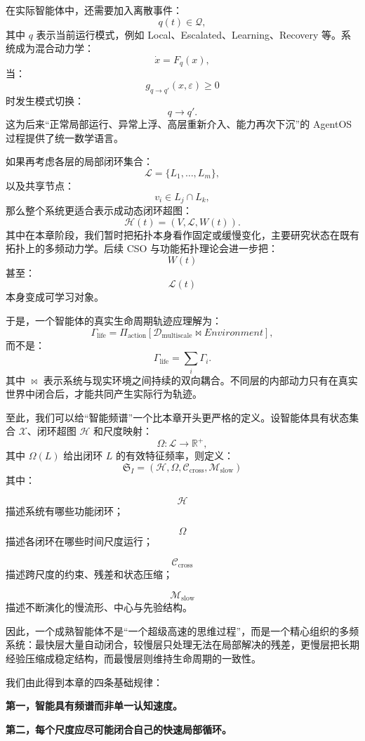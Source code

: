 在实际智能体中，还需要加入离散事件：
\[
q(t)\in\mathcal{Q},
\]
其中 $q$ 表示当前运行模式，例如 Local、Escalated、Learning、Recovery 等。系统成为混合动力学：
\[
\dot{x}
=
F_q(x),
\]
当：
\[
g_{q\rightarrow q'}(x,\varepsilon)
\geq0
\]
时发生模式切换：
\[
q\rightarrow q'.
\]
这为后来“正常局部运行、异常上浮、高层重新介入、能力再次下沉”的 AgentOS 过程提供了统一数学语言。

如果再考虑各层的局部闭环集合：
\[
\mathcal{L}
=
\{L_1,\ldots,L_m\},
\]
以及共享节点：
\[
v_i
\in
L_j\cap L_k,
\]
那么整个系统更适合表示成动态闭环超图：
\[
\mathcal{H}(t)
=
\left(
V,
\mathcal{L},
W(t)
\right).
\]
其中在本章阶段，我们暂时把拓扑本身看作固定或缓慢变化，主要研究状态在既有拓扑上的多频动力学。后续 CSO 与功能拓扑理论会进一步把：
\[
W(t)
\]
甚至：
\[
\mathcal{L}(t)
\]
本身变成可学习对象。

于是，一个智能体的真实生命周期轨迹应理解为：
\[
\Gamma_{\mathrm{life}}
=
\Pi_{\mathrm{action}}
\left[
\mathcal{D}_{\mathrm{multiscale}}
\bowtie
Environment
\right],
\]
而不是：
\[
\Gamma_{\mathrm{life}}
=
\sum_i
\Gamma_i.
\]
其中 $\bowtie$ 表示系统与现实环境之间持续的双向耦合。不同层的内部动力只有在真实世界中闭合后，才能共同产生实际行为轨迹。

至此，我们可以给“智能频谱”一个比本章开头更严格的定义。设智能体具有状态集合 $\mathcal{X}$、闭环超图 $\mathcal{H}$ 和尺度映射：
\[
\Omega:
\mathcal{L}
\rightarrow
\mathbb{R}^{+},
\]
其中 $\Omega(L)$ 给出闭环 $L$ 的有效特征频率，则定义：
\[
\boxed{
\mathfrak{S}_I
=
\left(
\mathcal{H},
\Omega,
\mathcal{C}_{\mathrm{cross}},
\mathcal{M}_{\mathrm{slow}}
\right)
}
\]
其中：

\[
\mathcal{H}
\]
描述系统有哪些功能闭环；

\[
\Omega
\]
描述各闭环在哪些时间尺度运行；

\[
\mathcal{C}_{\mathrm{cross}}
\]
描述跨尺度的约束、残差和状态压缩；

\[
\mathcal{M}_{\mathrm{slow}}
\]
描述不断演化的慢流形、中心与先验结构。

因此，一个成熟智能体不是“一个超级高速的思维过程”，而是一个精心组织的多频系统：最快层大量自动闭合，较慢层只处理无法在局部解决的残差，更慢层把长期经验压缩成稳定结构，而最慢层则维持生命周期的一致性。

我们由此得到本章的四条基础规律：

\begin{proposition*}
\bfseries 第一，智能具有频谱而非单一认知速度。
\end{proposition*}

\begin{statementbox}
\bfseries 第二，每个尺度应尽可能闭合自己的快速局部循环。
\end{statementbox}

